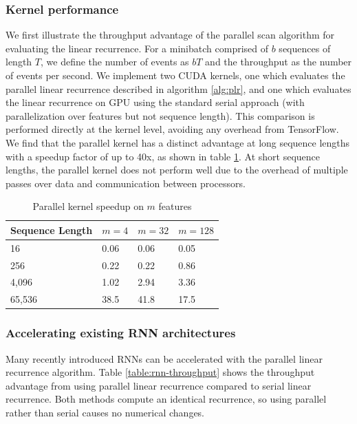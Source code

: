 \documentclass{article}
\begin{document}
\subsubsection{Kernel performance}
We first illustrate the throughput advantage of the parallel scan algorithm for
evaluating the linear recurrence. For a minibatch comprised of \(b\) sequences
of length \(T\), we define the number of events as \(bT\) and the throughput as
the number of events per second. We implement two CUDA kernels, one which
evaluates the parallel linear recurrence described in algorithm \ref{alg:plr},
and one which evaluates the linear recurrence on GPU using the standard serial
approach (with parallelization over features but not sequence length).
This comparison is performed directly at the kernel level, avoiding
any overhead from TensorFlow. We find that the parallel kernel has
a distinct advantage at long sequence lengths with a speedup factor of up to 40x,
as shown in table \ref{table:kernel-throughput}.
At short sequence lengths, the parallel kernel does not perform well due to the
overhead of multiple passes over data and communication between processors.
\begin{table}[t]
\caption{Parallel kernel speedup on $m$ features}
\begin{center}
\begin{tabular}{@{}llll@{}}
\label{table:kernel-throughput}
Sequence Length & \(m=4\)  & \(m=32\) & \(m=128\) \\ \midrule
16              & 0.06 & 0.06 & 0.05  \\
256             & 0.22 & 0.22 & 0.86  \\
4,096           & 1.02 & 2.94 & 3.36  \\
65,536          & 38.5 & 41.8 & 17.5  \\ \bottomrule
\end{tabular}
\end{center}
\end{table}

\subsubsection{Accelerating existing RNN architectures}

Many recently introduced RNNs can be accelerated with the parallel linear recurrence
algorithm.
Table \ref{table:rnn-throughput} shows the
throughput advantage from using parallel linear recurrence compared to
serial linear recurrence. Both methods compute an identical recurrence,
so using parallel rather than serial causes no numerical changes.
\end{document}
